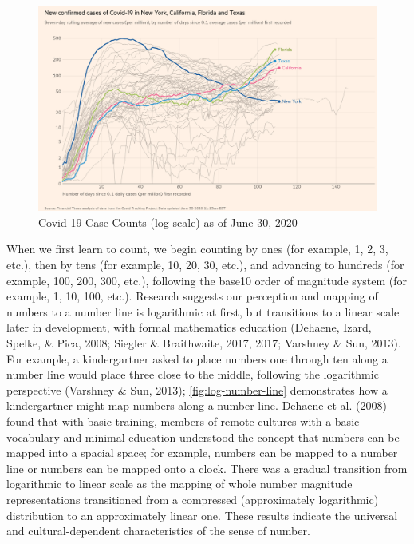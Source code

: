 \documentclass[print]{nuthesis}
\begin{document}
\begin{figure}[tbp]

{\centering \includegraphics[width=0.9\linewidth,]{images/covid19-FT-case-count-06.30.2020-log} 

}

\caption{Covid 19 Case Counts (log scale) as of June 30, 2020}\label{fig:covid19-FT-june2020-case-counts-log}
\end{figure}

When we first learn to count, we begin counting by ones (for example, 1, 2, 3, etc.), then by tens (for example, 10, 20, 30, etc.), and advancing to hundreds (for example, 100, 200, 300, etc.), following the base10 order of magnitude system (for example, 1, 10, 100, etc.).
Research suggests our perception and mapping of numbers to a number line is logarithmic at first, but transitions to a linear scale later in development, with formal mathematics education (Dehaene, Izard, Spelke, \& Pica, 2008; Siegler \& Braithwaite, 2017, 2017; Varshney \& Sun, 2013).
For example, a kindergartner asked to place numbers one through ten along a number line would place three close to the middle, following the logarithmic perspective (Varshney \& Sun, 2013); \cref{fig:log-number-line} demonstrates how a kindergartner might map numbers along a number line.
Dehaene et al. (2008) found that with basic training, members of remote cultures with a basic vocabulary and minimal education understood the concept that numbers can be mapped into a spacial space; for example, numbers can be mapped to a number line or numbers can be mapped onto a clock.
There was a gradual transition from logarithmic to linear scale as the mapping of whole number magnitude representations transitioned from a compressed (approximately logarithmic) distribution to an approximately linear one.
These results indicate the universal and cultural-dependent characteristics of the sense of number.
\end{document}
